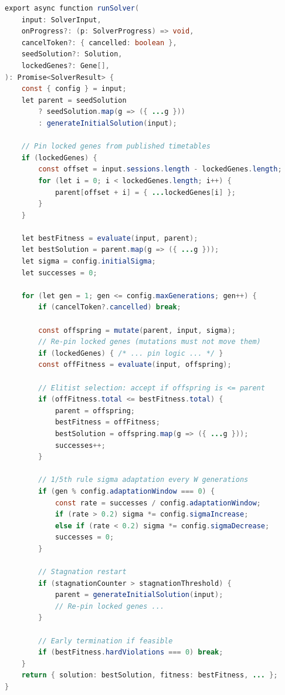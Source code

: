 \begin{lstlisting}[language=java, caption={(1+1)-ES Main Loop (solver.ts)}]
export async function runSolver(
    input: SolverInput,
    onProgress?: (p: SolverProgress) => void,
    cancelToken?: { cancelled: boolean },
    seedSolution?: Solution,
    lockedGenes?: Gene[],
): Promise<SolverResult> {
    const { config } = input;
    let parent = seedSolution
        ? seedSolution.map(g => ({ ...g }))
        : generateInitialSolution(input);

    // Pin locked genes from published timetables
    if (lockedGenes) {
        const offset = input.sessions.length - lockedGenes.length;
        for (let i = 0; i < lockedGenes.length; i++) {
            parent[offset + i] = { ...lockedGenes[i] };
        }
    }

    let bestFitness = evaluate(input, parent);
    let bestSolution = parent.map(g => ({ ...g }));
    let sigma = config.initialSigma;
    let successes = 0;

    for (let gen = 1; gen <= config.maxGenerations; gen++) {
        if (cancelToken?.cancelled) break;

        const offspring = mutate(parent, input, sigma);
        // Re-pin locked genes (mutations must not move them)
        if (lockedGenes) { /* ... pin logic ... */ }
        const offFitness = evaluate(input, offspring);

        // Elitist selection: accept if offspring is <= parent
        if (offFitness.total <= bestFitness.total) {
            parent = offspring;
            bestFitness = offFitness;
            bestSolution = offspring.map(g => ({ ...g }));
            successes++;
        }

        // 1/5th rule sigma adaptation every W generations
        if (gen % config.adaptationWindow === 0) {
            const rate = successes / config.adaptationWindow;
            if (rate > 0.2) sigma *= config.sigmaIncrease;
            else if (rate < 0.2) sigma *= config.sigmaDecrease;
            successes = 0;
        }

        // Stagnation restart
        if (stagnationCounter > stagnationThreshold) {
            parent = generateInitialSolution(input);
            // Re-pin locked genes ...
        }

        // Early termination if feasible
        if (bestFitness.hardViolations === 0) break;
    }
    return { solution: bestSolution, fitness: bestFitness, ... };
}
\end{lstlisting}

